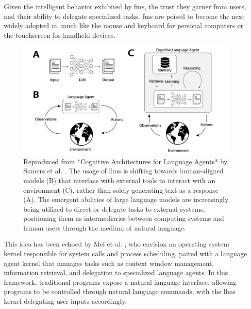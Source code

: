 \pskip

Given the intelligent behavior exhibited by \glspl{fm}, the trust they garner from users, and their ability to delegate specialized tasks, \glspl{fm} are poised to become the next widely adopted \Gls{ui}, much like the mouse and keyboard for personal computers or the touchscreen for handheld devices.

\begin{figure}[h!]
    \centering
    \captionsetup{format=plain, font=small, labelfont=bf}
    \includegraphics[width=\linewidth]{figures/cognitive_architectures.png}
    \caption[Illustration of Cognitive Architectures for Human Agents]{Reproduced from *Cognitive Architectures for Language Agents* by Sumers et al. \cite{sumers2024cognitivearchitectureslanguageagents}. The usage of \glspl{llm} is shifting towards human-aligned models (B) that interface with external tools to interact with an environment (C), rather than solely generating text as a response (A). The emergent abilities of large language models are increasingly being utilized to direct or delegate tasks to external systems, positioning them as intermediaries between computing systems and human users through the medium of natural language.}
    \label{fig:enter-label}
\end{figure}

\pskip

This idea has been echoed by Mei et al. \cite{aiasos}, who envision an operating system kernel responsible for system calls and process scheduling, paired with a language agent kernel that manages tasks such as context window management, information retrieval, and delegation to specialized language agents. In this framework, traditional programs expose a natural language interface, allowing programs to be controlled through natural language commands, with the \glspl{llm} kernel delegating user inputs accordingly.